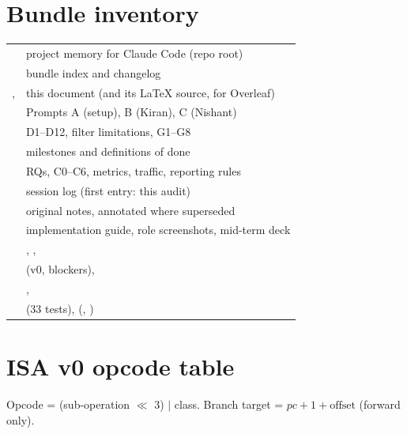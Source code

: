 \documentclass[10pt,a4paper]{article}
\begin{document}
\appendix
\section{Bundle inventory}
\begin{tabularx}{\textwidth}{@{}P{6.2cm}L@{}}
\toprule
{} & project memory for Claude Code (repo root) \\
 & bundle index and changelog \\
,  & this document (and its LaTeX source, for Overleaf) \\
 & Prompts A (setup), B (Kiran), C (Nishant) \\
 & D1--D12, filter limitations, G1--G8 \\
 & milestones and definitions of done \\
 & RQs, C0--C6, metrics, traffic, reporting rules \\
 & session log (first entry: this audit) \\
 & original notes, annotated where superseded \\
 & implementation guide, role screenshots, mid-term deck \\
 & , ,  \\
 &  (v0, blockers),  \\
 & ,  \\
 &  (33 tests),  (, ) \\
\bottomrule
\end{tabularx}

\section{ISA v0 opcode table}\label{app:isa}
Opcode = (sub-operation $\ll$ 3) $|$ class. Branch target = $pc + 1 + \text{offset}$ (forward only).
\end{document}
